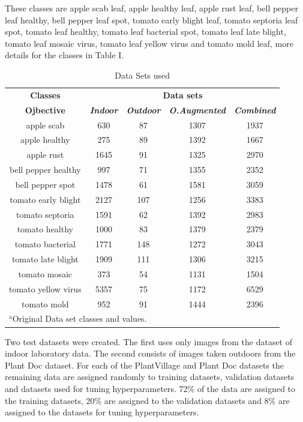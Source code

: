\documentclass[conference]{IEEEtran}
\begin{document}
These classes are apple scab leaf, apple healthy leaf, apple rust leaf, bell pepper leaf healthy, bell pepper leaf spot, tomato early blight leaf, tomato septoria leaf spot, tomato leaf healthy, tomato leaf bacterial spot, tomato leaf late blight, tomato leaf mosaic virus, tomato leaf yellow virus and tomato mold leaf, more details for the classes in Table I.
\begin{table}[htbp]
\caption{Data Sets used}
\begin{center}
\begin{tabular}{|c|c|c|c|c|}
\hline
\textbf{Classes}&\multicolumn{4}{|c|}{\textbf{Data sets}} \\
\cline{2-5} 
\textbf{Ojbective} & \textbf{\textit{Indoor}}& \textbf{\textit{Outdoor}}& \textbf{\textit{O.Augmented}} & \textbf{\textit{Combined}} \\
\hline
apple scab &630&87&1307&1937 \\
\hline
apple healthy &275&89&1392&1667\\
\hline
apple rust &1645&91&1325&2970\\
\hline
bell pepper healthy &997&71&1355&2352\\
\hline
bell pepper spot &1478&61&1581&3059\\
\hline
tomato early blight &2127&107&1256&3383\\
\hline
tomato septoria  &1591&62&1392&2983\\
\hline
tomato healthy &1000&83&1379&2379\\
\hline
tomato bacterial &1771&148&1272&3043\\
\hline
tomato late blight &1909&111&1306&3215\\
\hline
tomato mosaic  &373&54&1131&1504\\
\hline
tomato yellow virus &5357&75&1172&6529\\
\hline
tomato mold &952&91&1444&2396\\
\hline
\multicolumn{5}{l}{$^{\mathrm{a}}$Original Data set classes and values.}
\end{tabular}
\label{tab1}
\end{center}
\end{table}

Two test datasets were created. The first uses only images from the dataset of indoor laboratory data. The second consists of images taken outdoors from the Plant Doc dataset. For each of the PlantVillage and Plant Doc datasets the remaining data are assigned randomly to training datasets, validation datasets and datasets used for tuning hyperparameters. 72\% of the data are assigned to the training datasets, 20\% are assigned to the validation datasets and 8\% are assigned to the datasets for tuning hyperparameters. \
\end{document}
